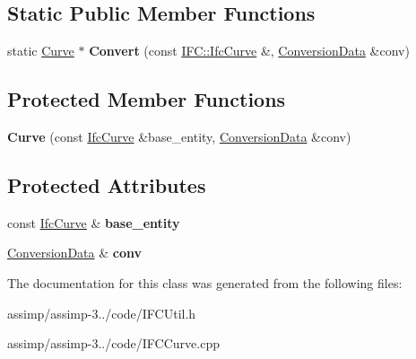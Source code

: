 \subsection*{Static Public Member Functions}
\begin{DoxyCompactItemize}
\item 
\hypertarget{class_assimp_1_1_i_f_c_1_1_curve_a9af75c21897a88ca31fe7af26355dc5a}{static \hyperlink{class_assimp_1_1_i_f_c_1_1_curve}{Curve} $\ast$ {\bfseries Convert} (const \hyperlink{struct_assimp_1_1_i_f_c_1_1_ifc_curve}{I\+F\+C\+::\+Ifc\+Curve} \&, \hyperlink{struct_assimp_1_1_i_f_c_1_1_conversion_data}{Conversion\+Data} \&conv)}\label{class_assimp_1_1_i_f_c_1_1_curve_a9af75c21897a88ca31fe7af26355dc5a}

\end{DoxyCompactItemize}
\subsection*{Protected Member Functions}
\begin{DoxyCompactItemize}
\item 
\hypertarget{class_assimp_1_1_i_f_c_1_1_curve_abbc31e019e77be28d037e8cc8ffa623d}{{\bfseries Curve} (const \hyperlink{struct_assimp_1_1_i_f_c_1_1_ifc_curve}{Ifc\+Curve} \&base\+\_\+entity, \hyperlink{struct_assimp_1_1_i_f_c_1_1_conversion_data}{Conversion\+Data} \&conv)}\label{class_assimp_1_1_i_f_c_1_1_curve_abbc31e019e77be28d037e8cc8ffa623d}

\end{DoxyCompactItemize}
\subsection*{Protected Attributes}
\begin{DoxyCompactItemize}
\item 
\hypertarget{class_assimp_1_1_i_f_c_1_1_curve_af01f596fda83191e86f558f3800076ef}{const \hyperlink{struct_assimp_1_1_i_f_c_1_1_ifc_curve}{Ifc\+Curve} \& {\bfseries base\+\_\+entity}}\label{class_assimp_1_1_i_f_c_1_1_curve_af01f596fda83191e86f558f3800076ef}

\item 
\hypertarget{class_assimp_1_1_i_f_c_1_1_curve_a303b26a77607633798d5926500e57b08}{\hyperlink{struct_assimp_1_1_i_f_c_1_1_conversion_data}{Conversion\+Data} \& {\bfseries conv}}\label{class_assimp_1_1_i_f_c_1_1_curve_a303b26a77607633798d5926500e57b08}

\end{DoxyCompactItemize}


The documentation for this class was generated from the following files\+:\begin{DoxyCompactItemize}
\item 
assimp/assimp-\/3../code/I\+F\+C\+Util.\+h\item 
assimp/assimp-\/3../code/I\+F\+C\+Curve.\+cpp\end{DoxyCompactItemize}
